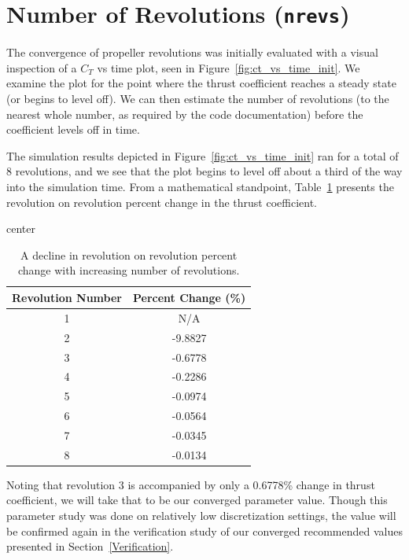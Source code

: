 \documentclass{article}
\begin{document}
\section{Number of Revolutions (\texttt{nrevs})}
The convergence of propeller revolutions was initially evaluated with a visual inspection of a $C_T$ vs time plot, seen in Figure~\ref{fig:ct_vs_time_init}.
We examine the plot for the point where the thrust coefficient reaches a steady state (or begins to level off). We can then estimate the number of revolutions (to the nearest whole number, as required by the code documentation) before the coefficient levels off in time.

The simulation results depicted in Figure~\ref{fig:ct_vs_time_init} ran for a total of 8 revolutions, and we see that the plot begins to level off about a third of the way into the simulation time. From a mathematical standpoint, Table~\ref{tab:ct_vs_time_percent} presents the revolution on revolution percent change in the thrust coefficient.

\begin{table}[H]
    \centering
    \caption{A decline in revolution on revolution percent change with increasing number of revolutions.}\label{tab:ct_vs_time_percent}
    \begin{adjustbox}{center}
    \begin{tabular}{c c}
        \toprule
        \textbf{Revolution Number} & \textbf{Percent Change (\%)} \\
        \midrule
        1 & N/A \\
        2 &  -9.8827 \\
        3 &  -0.6778 \\
        4 &  -0.2286 \\
        5 &  -0.0974 \\
        6 &  -0.0564 \\
        7 &  -0.0345 \\
        8 &  -0.0134 \\
        \bottomrule
    \end{tabular}
    \end{adjustbox}
\end{table}

Noting that revolution 3 is accompanied by only a 0.6778\% change in thrust coefficient, we will take that to be our converged parameter value.
Though this parameter study was done on relatively low discretization settings, the value will be confirmed again in the verification study of our converged recommended values presented in Section~\ref{Verification}.
\end{document}
